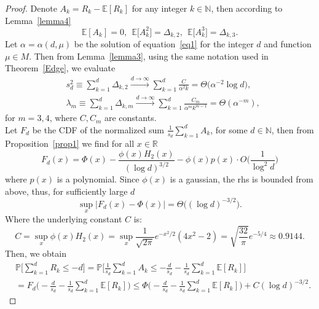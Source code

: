 \documentclass[pdflatex,sn-mathphys-num]{sn-jnl}%
\theoremstyle{thmstyleone}%
\theoremstyle{thmstyletwo}%
\theoremstyle{thmstylethree}%
\theoremstyle{thmstylethree}%
\theoremstyle{thmstylethree}%
\begin{document}
\begin{proof}
    Denote $A_k=R_k-\mathbb{E}[R_k]$ for any integer $k\in\mathbb{N}$, then according to Lemma~\ref{lemma4}
    \begin{equation*}
        \mathbb{E}[A_k]=0, \ \ \mathbb{E}\big[A_k^2\big]=\Delta_{k,2}, \ \ \mathbb{E}\big[A_k^3\big]=\Delta_{k,3}.
    \end{equation*}
    Let $\alpha=\alpha(d,\mu)$ be the solution of equation~\eqref{eq1} for the integer $d$ and function $\mu\in M$. Then from Lemma~\ref{lemma3}, using the same notation used in Theorem~\ref{Edge}, we evaluate
    \begin{equation*}
    \begin{split}
        &s_d^2\equiv\sum_{k=1}^d\Delta_{k,2}\xrightarrow{d\to\infty}\sum_{k=1}^d\frac{C}{\alpha^2k}=\Theta\big(\alpha^{-2}\log d\big), \\ &\lambda_m\equiv\sum_{k=1}^d\Delta_{k,m}\xrightarrow{d\to\infty}\sum_{k=1}^d\frac{C_m}{\alpha^mk^{m-1}}=\Theta(\alpha^{-m}),
    \end{split}
    \end{equation*}
    for $m=3,4$, where $C,C_m$ are constants. \\
    Let $F_d$ be the CDF of the normalized sum $\frac{1}{s_d}\sum_{k=1}^dA_k$, for some $d\in\mathbb{N}$, then from Proposition~\ref{prop1} we find for all $x\in\mathbb{R}$
    \begin{equation*}
        F_d(x)=\Phi(x)-\frac{\phi(x)H_2(x)}{(\log d)^{3/2}}-\phi(x)p(x)\cdot O\bigg(\frac{1}{\log^2d}\bigg)
    \end{equation*}
    where $p(x)$ is a polynomial. Since $\phi(x)$ is a gaussian, the rhs is bounded from above, thus, for sufficiently large $d$
    \begin{equation*}
        \sup_x\big|F_d(x)-\Phi(x)\big|=\Theta\Big((\log d)^{-3/2}\Big).
    \end{equation*}
    Where the underlying constant $C$ is:
    \begin{equation}
        C=\sup_x\phi(x)H_2(x)=\sup_x\frac{1}{\sqrt{2\pi}}e^{-x^2/2}(4x^2-2)=\sqrt{\frac{32}{\pi}}e^{-5/4}\approx0.9144.
    \end{equation}
    Then, we obtain
    \begin{equation*}
    \begin{split}
        &\mathbb{P}\bigg[\sum_{k=1}^dR_k\le-d\bigg]=\mathbb{P}\bigg[\frac{1}{s_d}\sum_{k=1}^dA_k\le-\frac{d}{s_d}-\frac{1}{s_d}\sum_{k=1}^d\mathbb{E}[R_k]\bigg] \\
        &=F_d\bigg(-\frac{d}{s_d}-\frac{1}{s_d}\sum_{k=1}^d\mathbb{E}[R_k]\bigg)\le \Phi\bigg(-\frac{d}{s_d}-\frac{1}{s_d}\sum_{k=1}^d\mathbb{E}[R_k]\bigg)+C(\log d)^{-3/2}.

\end{split}
\end{equation*}
\end{proof}
\end{document}
